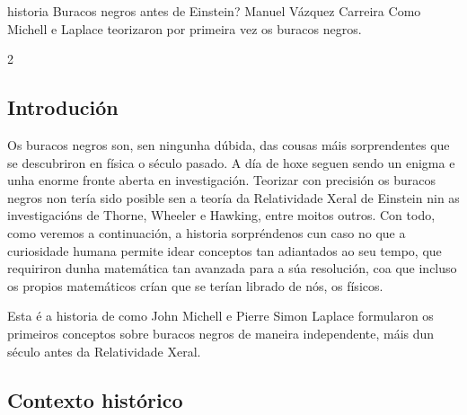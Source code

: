 \Titular%
{historia}%
{Buracos negros antes de Einstein?}%
{Manuel Vázquez Carreira}%
{Como Michell e Laplace teorizaron por primeira vez os buracos negros.}%


\begin{multicols}{2}

%
%

\subsection*{Introdución}

Os buracos negros son, sen ningunha dúbida, das cousas máis sorprendentes que
se descubriron en física o século pasado. A día de hoxe seguen sendo un enigma
e unha enorme fronte aberta en investigación. Teorizar con precisión os buracos
negros non tería sido posible sen a teoría da Relatividade Xeral de Einstein
nin as investigacións de Thorne, Wheeler e Hawking, entre moitos outros. Con
todo, como veremos a continuación, a historia sorpréndenos cun caso no que a
curiosidade humana permite idear conceptos tan adiantados ao seu tempo, que
requiriron dunha matemática tan avanzada para a súa resolución, coa que incluso os
propios matemáticos crían que se terían librado de nós, os físicos.

Esta é a historia de como John Michell e Pierre Simon Laplace formularon os
primeiros conceptos sobre buracos negros de maneira independente, máis dun
século antes da Relatividade Xeral.

\subsection*{Contexto histórico}


\end{multicols}
